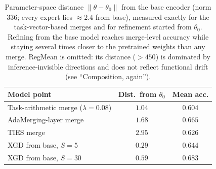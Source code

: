 \documentclass{article} %
\begin{document}
\begin{table}[t]
\centering
\small
\caption{Parameter-space distance $\lVert\theta-\theta_0\rVert$ from the base encoder (norm $336$; every expert lies ${\approx}2.4$ from base), measured exactly for the task-vector-based merges and for refinement started from $\theta_0$. Refining from the base model reaches merge-level accuracy while staying several times closer to the pretrained weights than any merge. RegMean is omitted: its distance ($>450$) is dominated by inference-invisible directions and does not reflect functional drift (see ``Composition, again'').}
\label{tab:clip20dist}
\begin{tabular}{lcc}
\toprule
Model point & Dist.\ from $\theta_0$ & Mean acc. \\
\midrule
Task-arithmetic merge ($\lambda{=}0.08$)   & $1.04$ & $0.604$ \\
AdaMerging-layer merge                     & $1.68$ & $0.665$ \\
TIES merge                                 & $2.95$ & $0.626$ \\
\midrule
XGD from base, $S{=}5$                      & $\mathbf{0.29}$ & $0.644$ \\
XGD from base, $S{=}30$                     & $0.59$ & $0.683$ \\
\bottomrule
\end{tabular}
\end{table}
\end{document}
